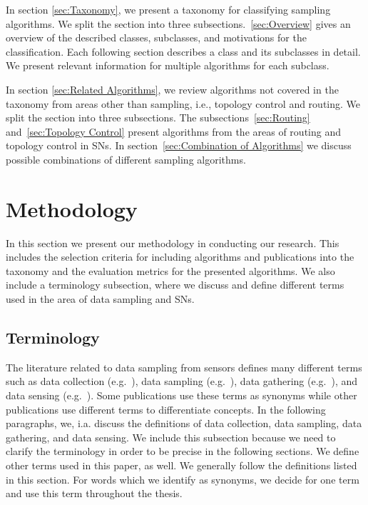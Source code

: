   In section \ref{sec:Taxonomy}, we present a
taxonomy for classifying sampling algorithms. We split the section  into three
subsections.~\ref{sec:Overview} gives an overview of the described classes,
subclasses, and motivations for the classification. Each following section
describes a class and its subclasses in detail. We present relevant information
for multiple algorithms for each subclass. 

 In section \ref{sec:Related
Algorithms}, we review algorithms not covered in the taxonomy from areas other
than sampling, i.e., topology control and routing. We split the section into
three subsections. The subsections~\ref{sec:Routing} and~\ref{sec:Topology
Control} present algorithms from the areas of routing and topology control in
\acp{SN}. In section~\ref{sec:Combination of Algorithms} we discuss possible
combinations of different sampling algorithms.

\section{Methodology}
\label{sec:Methodology}

In this section we present our methodology in conducting our research. This
includes the selection criteria for including algorithms and publications into
the taxonomy and the evaluation metrics for the presented algorithms. We also
include a terminology subsection, where we discuss and define different terms
used in the area of data sampling and \acp{SN}.

\subsection{Terminology}
\label{sec:Terminology}

The literature related to data sampling from sensors defines many different
terms such as data collection (e.g.~\cite{laiymani2013adaptive, liu2007energy,
wang2012adaptive}), data sampling (e.g.~\cite{willett2004backcasting,
jain2004adaptive, szczytowski2010asample}), data gathering
(e.g.~\cite{wang2012data, luo2009compressive, zhang2016data}), and data sensing
(e.g.~\cite{padhy2006utility, mahmudimanesh2012balanced, duarte2005joint}).
Some publications use these terms as synonyms while other publications use
different terms to differentiate concepts. In the following paragraphs, we,
i.a. discuss the definitions of data collection, data sampling, data gathering,
and data sensing. We include this subsection because we need to clarify the
terminology in order to be precise in the following sections. We define other
terms used in this paper, as well. We generally follow the definitions listed
in this section. For words which we identify as synonyms, we decide for one
term and use this term throughout the thesis.

